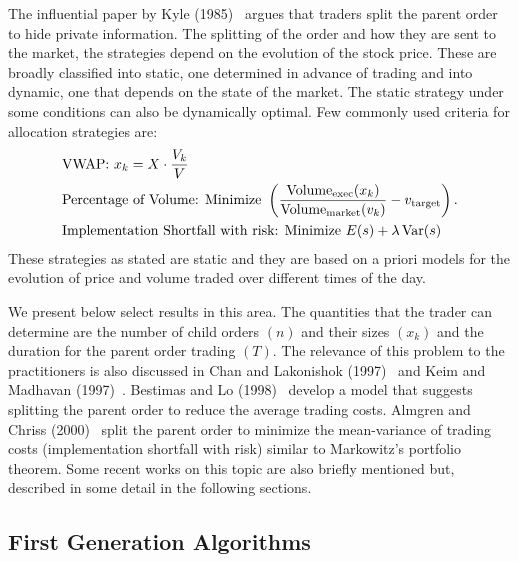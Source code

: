 The influential paper by Kyle (1985)~\cite{kyle1985} argues that traders split the parent order to hide private information. The splitting of the order and how they are sent to the market, the strategies depend on the evolution of the stock price. These are broadly classified into static, one determined in advance of trading and into dynamic, one that depends on the state of the market. The static strategy under some conditions can also be dynamically optimal. Few commonly used criteria for allocation strategies are:
	\[
	\begin{split}
	&\text{VWAP: } x_k= X \cdot \dfrac{V_k}{V} \\
	&\text{Percentage of Volume: Minimize } \left( \dfrac{\text{Volume}_{\text{exec}}(x_k)}{\text{Volume}_{\text{market}}(v_k)} - v_{\text{target}} \right). \\
	&\text{Implementation Shortfall with risk: Minimize } E(s) + \lambda \operatorname{Var}(s)
	\end{split}
	\]
These strategies as stated are static and they are based on a priori models for the evolution of price and volume traded over different times of the day. 


We present below select results in this area. The quantities that the trader can determine are the number of child orders $(n)$ and their sizes $(x_k)$ and the duration for the parent order trading $(T)$. The relevance of this problem to the practitioners is also discussed in Chan and Lakonishok (1997)~\cite{lakon} and Keim and Madhavan (1997)~\cite{madhavan}. Bestimas and Lo (1998)~\cite{berlo} develop a model that suggests splitting the parent order to reduce the average trading costs. Almgren and Chriss (2000)~\cite{alm2000} split the parent order to minimize the mean-variance of trading costs (implementation shortfall with risk) similar to Markowitz's portfolio theorem. Some recent works on this topic are also briefly mentioned but, described in some detail in the following sections.



\subsection{First Generation Algorithms \label{sec:first_gen}}


